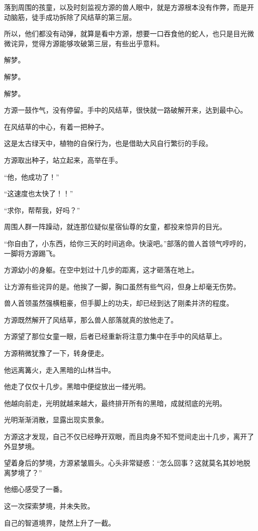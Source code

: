 \begin{this_body}
落到周围的孩童，以及时刻监视方源的兽人眼中，就是方源根本没有作弊，而是开动脑筋，徒手成功拆除了风结草的第三层。

所以，他们都没有动弹，就算是看中方源，想要一口吞食他的蛇人，也只是目光微微诧异，觉得方源能够攻破第三层，有些出乎意料。

解梦。

解梦。

解梦。

方源一鼓作气，没有停留。手中的风结草，很快就一路破解开来，达到最中心。

在风结草的中心，有着一把种子。

这是太古绿天中，植物的自保行为，也是借助大风自行繁衍的手段。

方源取出种子，站立起来，高举在手。

“他，他成功了！”

“这速度也太快了！！”

“求你，帮帮我，好吗？”

周围人群一阵躁动，就连那位疑似星宿仙尊的女童，都投来惊异的目光。

“你自由了，小东西，给你三天的时间逃命。快滚吧。”部落的兽人首领气哼哼的，一脚将方源踢飞。

方源幼小的身躯。在空中划过十几步的距离，这才砸落在地上。

让方源有些诧异的是。他挨了一脚，胸口虽然有些气闷，但身上却毫无伤势。

兽人首领虽然强横粗豪，但手脚上的功夫，却已经到达了刚柔并济的程度。

方源既然解开了风结草，那么兽人部落就真的放他走了。

方源望了那位女童一眼，后者已经重新将注意力集中在手中的风结草上。

方源稍微犹豫了一下，转身便走。

他远离篝火，走入黑暗的山林当中。

他走了仅仅十几步。黑暗中便绽放出一缕光明。

他越向前走，光明就越来越大，最终排开所有的黑暗，成就彻底的光明。

光明渐渐消散，显露出现实景象。

方源这才发现，自己不仅已经睁开双眼，而且肉身不知不觉间走出十几步，离开了外显梦境。

望着身后的梦境，方源紧皱眉头。心头非常疑惑：“怎么回事？这就莫名其妙地脱离梦境了？”

他细心感受了一番。

这一次探索梦境，并未失败。

自己的智道境界，陡然上升了一截。


\end{this_body}
